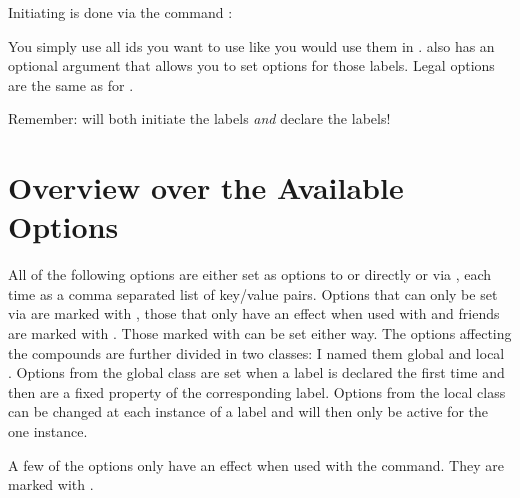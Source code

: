 \documentclass[load-preamble+,babel-options={ngerman,british,american}]{cnltx-doc}
\begin{document}
Initiating is done via the command :
\begin{sourcecode}
\end{sourcecode}
You simply use all \acp{id} you want to use like you would use them in
.   also has an optional argument that allows you to set
options for those labels.  Legal options are the same as for .

Remember:  will both initiate the labels \emph{and} declare the
labels!

\section{Overview over the Available Options}\label{sec:overv-over-avail-1}
All of the following options are either
set as options to  or  directly or via
, each time as a comma separated list of
key/value pairs.  Options that can only be set via  are marked
with , those that only have an effect when used with  and
friends are marked with .  Those marked with  can
be set either way.  The options affecting the compounds are further divided in
two classes: I named them global  and local . Options
from the global class are set when a label is declared the first time and then
are a fixed property of the corresponding label.  Options from the local class
can be changed at each instance of a label and will then only be active for
the one instance.

A few of the options only have an effect when used with the 
command.  They are marked with .
\end{document}
